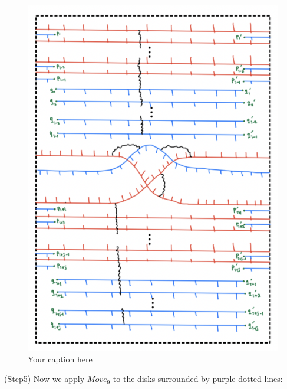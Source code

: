 \begin{figure}[H] %
    \centering
    \includegraphics[width=\linewidth]{diagrams/theorem12/10.png} %
    \caption{Your caption here}
    \label{fig:your-label}
\end{figure}

(Step5) Now we apply $Move_9$ to the disks surrounded by purple dotted lines:

